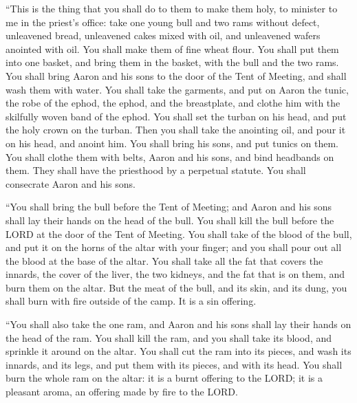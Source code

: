  ``This is the thing that you shall do to them to make
them holy, to minister to me in the priest's office: take one young bull
and two rams without defect,  unleavened bread, unleavened
cakes mixed with oil, and unleavened wafers anointed with oil. You shall
make them of fine wheat flour.  You shall put them into
one basket, and bring them in the basket, with the bull and the two
rams.  You shall bring Aaron and his sons to the door of
the Tent of Meeting, and shall wash them with water.  You
shall take the garments, and put on Aaron the tunic, the robe of the
ephod, the ephod, and the breastplate, and clothe him with the skilfully
woven band of the ephod.  You shall set the turban on his
head, and put the holy crown on the turban.  Then you
shall take the anointing oil, and pour it on his head, and anoint him.
 You shall bring his sons, and put tunics on them.
 You shall clothe them with belts, Aaron and his sons, and
bind headbands on them. They shall have the priesthood by a perpetual
statute. You shall consecrate Aaron and his sons.

 ``You shall bring the bull before the Tent of Meeting;
and Aaron and his sons shall lay their hands on the head of the bull.
 You shall kill the bull before the LORD at the door of
the Tent of Meeting.  You shall take of the blood of the
bull, and put it on the horns of the altar with your finger; and you
shall pour out all the blood at the base of the altar. 
You shall take all the fat that covers the innards, the cover of the
liver, the two kidneys, and the fat that is on them, and burn them on
the altar.  But the meat of the bull, and its skin, and
its dung, you shall burn with fire outside of the camp. It is a sin
offering.

 ``You shall also take the one ram, and Aaron and his
sons shall lay their hands on the head of the ram.  You
shall kill the ram, and you shall take its blood, and sprinkle it around
on the altar.  You shall cut the ram into its pieces, and
wash its innards, and its legs, and put them with its pieces, and with
its head.  You shall burn the whole ram on the altar: it
is a burnt offering to the LORD; it is a pleasant aroma, an offering
made by fire to the LORD.

